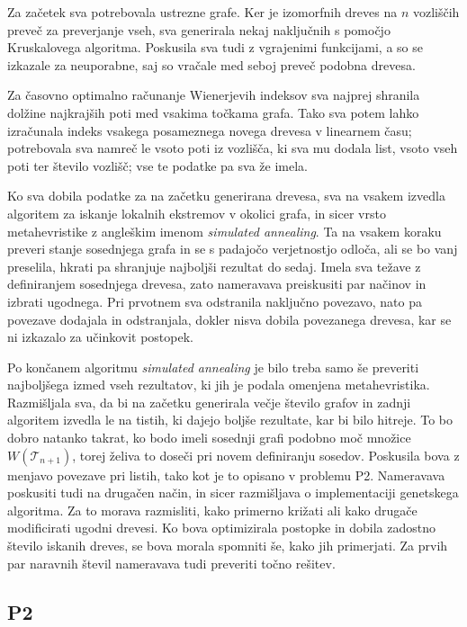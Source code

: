 \documentclass[a4paper, 12 pt]{article}
\begin{document}
\itshape{Za začetek sva potrebovala ustrezne grafe. Ker je izomorfnih dreves na $n$ vozliščih preveč za preverjanje vseh, sva generirala nekaj naključnih s pomočjo Kruskalovega algoritma. Poskusila sva tudi z vgrajenimi funkcijami, a so se izkazale za neuporabne, saj so vračale med seboj preveč podobna drevesa. \newline

Za časovno optimalno računanje Wienerjevih indeksov sva najprej shranila dolžine najkrajših poti med vsakima točkama grafa. Tako sva potem lahko izračunala indeks vsakega posameznega novega drevesa v linearnem času; potrebovala sva namreč le vsoto poti iz vozlišča, ki sva mu dodala list, vsoto vseh poti ter število vozlišč; vse te podatke pa sva že imela. \newline

 Ko sva dobila podatke za na začetku generirana drevesa, sva na vsakem izvedla algoritem za iskanje lokalnih ekstremov v okolici grafa, in sicer vrsto metahevristike z angleškim imenom \textit{simulated annealing}. Ta na vsakem koraku preveri stanje sosednjega grafa in se s padajočo verjetnostjo odloča, ali se bo vanj preselila, hkrati pa shranjuje najboljši rezultat do sedaj. Imela sva težave z definiranjem sosednjega drevesa, zato nameravava preiskusiti par načinov in izbrati ugodnega. Pri prvotnem sva odstranila naključno povezavo, nato pa povezave dodajala in odstranjala, dokler nisva dobila povezanega drevesa, kar se ni izkazalo za učinkovit postopek. \newline

Po končanem algoritmu \textit{simulated annealing} je bilo treba samo še preveriti najboljšega izmed vseh rezultatov, ki jih je podala omenjena metahevristika. Razmišljala sva, da bi na začetku generirala večje število grafov in zadnji algoritem izvedla le na tistih, ki dajejo boljše rezultate, kar bi bilo hitreje. To bo dobro natanko takrat, ko bodo imeli sosednji grafi podobno moč množice $W(\mathscr{T}_{n+1})$, torej želiva to doseči pri novem definiranju sosedov. Poskusila bova z menjavo povezave pri listih, tako kot je to opisano v problemu P2. Nameravava poskusiti tudi na drugačen način, in sicer razmišljava o implementaciji genetskega algoritma. Za to morava razmisliti, kako primerno križati ali kako drugače modificirati ugodni drevesi. Ko bova optimizirala postopke in dobila zadostno število iskanih dreves, se bova morala spomniti še, kako jih primerjati. Za prvih par naravnih števil nameravava tudi preveriti točno rešitev.

\subsection{P2}


}
\end{document}
